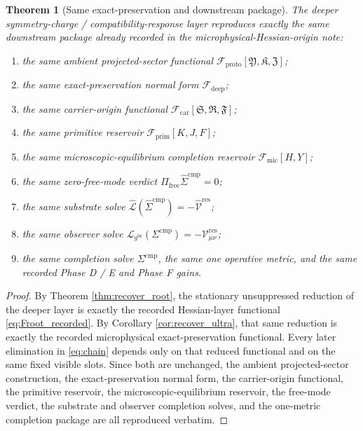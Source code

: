 \documentclass[11pt]{article}
\newcommand{\ObserverMetric}{g^{\mathrm{br}}}
\newcommand{\CompShift}{\Sigma^{\mathrm{cmp}}}
\newcommand{\CompLift}{\widehat\Sigma^{\mathrm{cmp}}}
\newcommand{\ResidualCore}{\mathcal V_{\mu\nu}^{\mathrm{res}}}
\newcommand{\ResidualLift}{\widehat{\mathcal V}^{\mathrm{res}}}
\newcommand{\SubReducedEin}{\widehat{\mathcal L}}
\newcommand{\FreeProj}{\Pi_{\mathrm{free}}}
\newcommand{\GaugeAux}{Y}
\newcommand{\ReducedEin}{\mathcal L_{\ObserverMetric}}
\newcommand{\MicFunctional}{\mathscr F_{\mathrm{mic}}}
\newcommand{\PrimFunctional}{\mathscr F_{\mathrm{prim}}}
\newcommand{\CarrierFunctional}{\mathscr F_{\mathrm{car}}}
\newcommand{\DeepFunctional}{\mathscr F_{\mathrm{deep}}}
\newcommand{\ProtoFunctional}{\mathscr F_{\mathrm{proto}}}
\newcommand{\PrimStrain}{K}
\newcommand{\PrimNeutral}{J}
\newcommand{\PrimFree}{F}
\newcommand{\CarrierSeed}{\mathfrak S}
\newcommand{\RelabelSeed}{\mathfrak R}
\newcommand{\FreeSeed}{\mathfrak F}
\newcommand{\ProtoTensor}{\mathfrak Y}
\newcommand{\ProtoRelabel}{\mathfrak K}
\newcommand{\ProtoFree}{\mathfrak Z}
\newtheorem{theorem}{Theorem}
\begin{document}
\begin{theorem}[Same exact-preservation and downstream package]
\label{thm:same_package}
The deeper symmetry-charge / compatibility-response layer reproduces exactly the same downstream package already recorded in the microphysical-Hessian-origin note:
\begin{enumerate}
    \item the same ambient projected-sector functional \(\ProtoFunctional[\ProtoTensor,\ProtoRelabel,\ProtoFree]\);
    \item the same exact-preservation normal form \(\DeepFunctional\);
    \item the same carrier-origin functional \(\CarrierFunctional[\CarrierSeed,\RelabelSeed,\FreeSeed]\);
    \item the same primitive reservoir \(\PrimFunctional[\PrimStrain,\PrimNeutral,\PrimFree]\);
    \item the same microscopic-equilibrium completion reservoir \(\MicFunctional[H,\GaugeAux]\);
    \item the same zero-free-mode verdict \(\FreeProj \CompLift=0\);
    \item the same substrate solve \(\SubReducedEin(\CompLift)=-\ResidualLift\);
    \item the same observer solve \(\ReducedEin(\CompShift)=-\ResidualCore\);
    \item the same completion solve \(\Sigma^{\mathrm{cmp}}\), the same one operative metric, and the same recorded Phase D / E and Phase F gains.
\end{enumerate}
\end{theorem}

\begin{proof}
By Theorem \ref{thm:recover_root}, the stationary unsuppressed reduction of the deeper layer is exactly the recorded Hessian-layer functional \eqref{eq:Froot_recorded}. By Corollary \ref{cor:recover_ultra}, that same reduction is exactly the recorded microphysical exact-preservation functional. Every later elimination in \eqref{eq:chain} depends only on that reduced functional and on the same fixed visible slots. Since both are unchanged, the ambient projected-sector construction, the exact-preservation normal form, the carrier-origin functional, the primitive reservoir, the microscopic-equilibrium reservoir, the free-mode verdict, the substrate and observer completion solves, and the one-metric completion package are all reproduced verbatim.
\end{proof}
\end{document}
